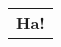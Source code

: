 \documentclass{article}
\begin{document}
\begin{tabular}{c}
   \textbf{Ha!}
\end{tabular}
\end{document}
